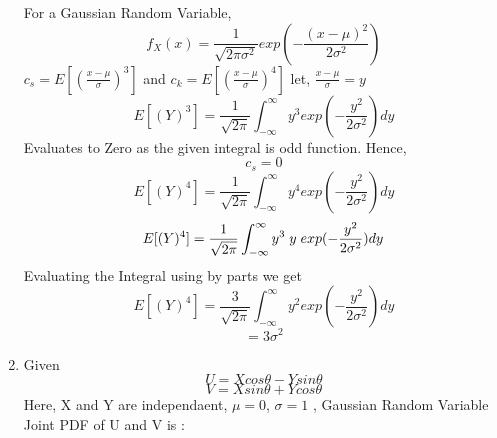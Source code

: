 \documentclass{article}
\begin{document}
\begin{enumerate}
For a Gaussian Random Variable,
$$f_{X}(x) = \frac{1}{\sqrt{2\pi\sigma^2}}exp(-\frac{(x-\mu)^2}{2\sigma^2})$$
\newline
$c_s = E[(\frac{x - \mu}{\sigma})^3]$ and $c_k = E[(\frac{x - \mu}{\sigma})^4]$
\newline
\newline
let, $\frac{x - \mu}{\sigma} = y$
$$E[(Y)^3] = \frac{1}{\sqrt{2\pi}}\int_{-\infty}^{\infty} y^{3} exp(-\frac{y^2}{2\sigma^2})dy$$
\newline
Evaluates to Zero as the given integral is odd function. Hence,
$$c_s = 0$$
$$E[(Y)^4] = \frac{1}{\sqrt{2\pi}}\int_{-\infty}^{\infty} y^{4} exp(-\frac{y^2}{2\sigma^2})dy$$
$$E[(Y)^4] = \frac{1}{\sqrt{2\pi}}\int_{-\infty}^{\infty} y^{3}\hspace{1mm}y\hspace{1mm} exp(-\frac{y^2}{2\sigma^2})dy$$
Evaluating the Integral using by parts we get
$$E[(Y)^4] = \frac{3}{\sqrt{2\pi}}\int_{-\infty}^{\infty} y^{2} exp(-\frac{y^2}{2\sigma^2})dy$$
$$= 3\sigma^2$$

\newpage
\item Given \\ 
$$U = Xcos\theta - Ysin\theta $$
$$V = Xsin\theta +Ycos\theta$$
Here, X and Y are independaent, $\mu =0 $, $\sigma=1$ , Gaussian Random Variable
Joint PDF of U and V is :


\end{enumerate}
\end{document}
